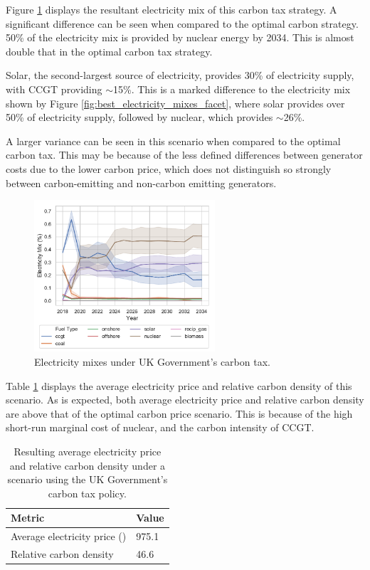 Figure \ref{fig:uk_government_carbon_tax_strategy_scenario} displays the resultant electricity mix of this carbon tax strategy. A significant difference can be seen when compared to the optimal carbon strategy. 50\% of the electricity mix is provided by nuclear energy by 2034. This is almost double that in the optimal carbon tax strategy. 

Solar, the second-largest source of electricity, provides 30\% of electricity supply, with CCGT providing ${\sim}$15\%. This is a marked difference to the electricity mix shown by Figure \ref{fig:best_electricity_mixes_facet}, where solar provides over 50\% of electricity supply, followed by nuclear, which provides ${\sim}$26\%. 

A larger variance can be seen in this scenario when compared to the optimal carbon tax. This may be because of the less defined differences between generator costs due to the lower carbon price, which does not distinguish so strongly between carbon-emitting and non-carbon emitting generators. 

\begin{figure}
	\centering
	\includegraphics[width=0.6\textwidth]{Chapter6/figures/results/uk_scenario_co2_strategy.pdf}
	\caption{Electricity mixes under UK Government's carbon tax.}
	\label{fig:uk_government_carbon_tax_strategy_scenario}
\end{figure}

Table \ref{carbonoptim:table:mix} displays the average electricity price and relative carbon density of this scenario. As is expected, both average electricity price and relative carbon density are above that of the optimal carbon price scenario. This is because of the high short-run marginal cost of nuclear, and the carbon intensity of CCGT. 

\begin{table}[]
	\centering	
	\begin{tabular}{@{}ll@{}}
		\toprule
		Metric & Value \\ \midrule
		Average electricity price (\textsterling) & 975.1 \\
		Relative carbon density                   & 46.6  \\ \bottomrule
	\end{tabular}
	\caption{Resulting average electricity price and relative carbon density under a scenario using the UK Government's carbon tax policy.}
	\label{carbonoptim:table:mix}
\end{table}

